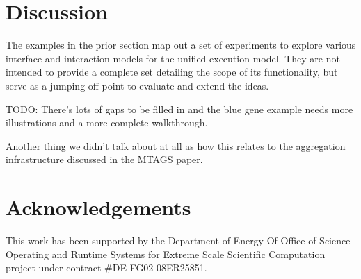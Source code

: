 \documentclass{sig-alternate}
\begin{document}
\section{Discussion}

The examples in the prior section map out a set of experiments to explore
various interface and interaction models for the unified execution model.
They are not intended to provide a complete set detailing the scope of its
functionality, but serve as a jumping off point to evaluate and extend
the ideas.

TODO: There's lots of gaps to be filled in and the blue gene example needs more
illustrations and a more complete walkthrough.

Another thing we didn't talk about at all as how this relates to the
aggregation infrastructure discussed in the MTAGS paper.

\section{Acknowledgements}

This work has been supported by the Department of Energy Of Office of 
Science Operating and Runtime Systems for Extreme Scale Scientific 
Computation project under contract \#DE-FG02-08ER25851.

%
%
\end{document}
